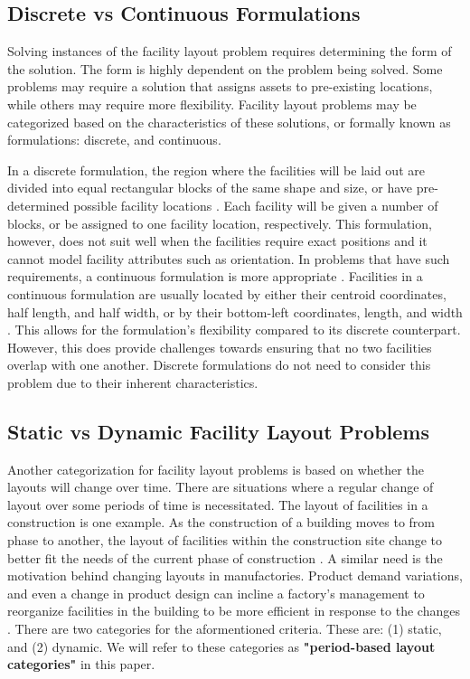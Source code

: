 \subsection{Discrete vs Continuous Formulations}
Solving instances of the facility layout problem requires determining the form of the solution. The form is highly dependent on the problem being solved. Some problems may require a solution that assigns assets to pre-existing locations, while others may require more flexibility. Facility layout problems may be categorized based on the characteristics of these solutions, or formally known as formulations: discrete, and continuous.

In a discrete formulation, the region where the facilities will be laid out are divided into equal rectangular blocks of the same shape and size, or have pre-determined possible facility locations \cite{Drira2007}. Each facility will be given a number of blocks, or be assigned to one facility location, respectively. This formulation, however, does not suit well when the facilities require exact positions and it cannot model facility attributes such as orientation. In problems that have such requirements, a continuous formulation is more appropriate \cite{Hosseini-Nasab2018}. Facilities in a continuous formulation are usually located by either their centroid coordinates, half length, and half width, or by their bottom-left coordinates, length, and width \cite{Drira2007}. This allows for the formulation's flexibility compared to its discrete counterpart. However, this does provide challenges towards ensuring that no two facilities overlap with one another. Discrete formulations do not need to consider this problem due to their inherent characteristics.

\subsection{Static vs Dynamic Facility Layout Problems}
Another categorization for facility layout problems is based on whether the layouts will change over time. There are situations where a regular change of layout over some periods of time is necessitated. The layout of facilities in a construction is one example. As the construction of a building moves to from phase to another, the layout of facilities within the construction site change to better fit the needs of the current phase of construction \cite{Farmakis2018}. A similar need is the motivation behind changing layouts in manufactories. Product demand variations, and even a change in product design can incline a factory's management to reorganize facilities in the building to be more efficient in response to the changes \cite{Pourhassan2017}. There are two categories for the aformentioned criteria. These are: (1) static, and (2) dynamic. We will refer to these categories as \textbf{"period-based layout categories"} in this paper.

